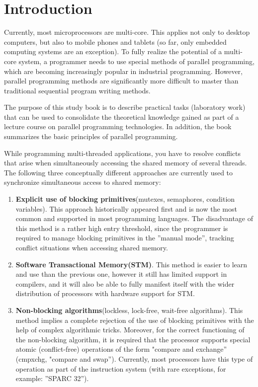{ %
	\section*{Introduction}
	\par Currently, most microprocessors are multi-core. This applies not only to desktop computers, but also to mobile phones and tablets (so far, only embedded computing systems are an exception). To fully realize the potential of a multi-core system, a programmer needs to use special methods of parallel programming, which are becoming increasingly popular in industrial programming. However, parallel programming methods are significantly more difficult to master than traditional sequential program writing methods.
	\par The purpose of this study book is to describe practical tasks (laboratory work) that can be used to consolidate the theoretical knowledge gained as part of a lecture course on parallel programming technologies. In addition, the book summarizes the basic principles of parallel programming.%
	\par While programming multi-threaded applications, you have to resolve conflicts that arise when simultaneously accessing the shared memory of several threads. The following three conceptually different approaches are currently used to synchronize simultaneous access to shared memory:
	\begin{enumerate}
		\item\textbf{Explicit use of blocking primitives}\quad(mutexes, semaphores, condition variables). This approach historically appeared first and is now the most common and supported in most programming languages. The disadvantage of this method is a rather high entry threshold, since the programmer is required to manage blocking primitives in the  ''manual mode'', tracking conflict situations when accessing shared memory.
		\item\textbf{Software Transactional Memory(STM)}. This method is easier to learn and use than the previous one, however it still has limited support in compilers, and it will also be able to fully manifest itself with the wider distribution of processors with hardware support for STM.
		\item\textbf{Non-blocking algorithms}\quad(lockless, lock-free, wait-free algorithms). This method implies a complete rejection of the use of blocking primitives with the help of complex algorithmic tricks. Moreover, for the correct functioning of the non-blocking algorithm, it is required that the processor supports special atomic (conflict-free) operations of the form "compare and exchange'' (cmpxchg, "compare and swap''). Currently, most processors have this type of operation as part of the instruction system (with rare exceptions, for example: ''SPARC 32'').

\end{enumerate}}
